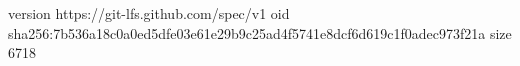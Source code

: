 version https://git-lfs.github.com/spec/v1
oid sha256:7b536a18c0a0ed5dfe03e61e29b9c25ad4f5741e8dcf6d619c1f0adec973f21a
size 6718
